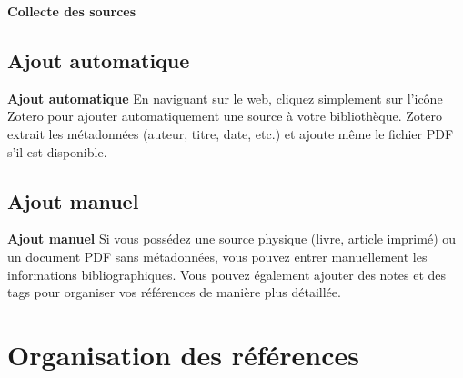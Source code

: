 \documentclass{beamer}
\begin{document}
\begin{frame}{\textbf{Collecte des sources}}
	
\subsection{Ajout automatique}
	
\begin{block}{\textbf{Ajout automatique}}
En naviguant sur le web, cliquez simplement sur l'icône Zotero pour ajouter automatiquement une source à votre bibliothèque. Zotero extrait les métadonnées (auteur, titre, date, etc.) et ajoute même le fichier PDF s'il est disponible.
\end{block}
	
	
\subsection{Ajout manuel}

\begin{block}{\textbf{Ajout manuel}}
Si vous possédez une source physique (livre, article imprimé) ou un document PDF sans métadonnées, vous pouvez entrer manuellement les informations bibliographiques. Vous pouvez également ajouter des notes et des tags pour organiser vos références de manière plus détaillée.
\end{block}
	
\end{frame}

\section{Organisation des références}
\end{document}

